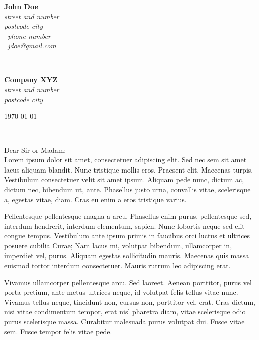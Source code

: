 \documentclass[11pt]{article}
\begin{document}
\hfill%
\begin{minipage}[t]{.6\textwidth}
\raggedleft%
{\bfseries John Doe}\\[.35ex]
\small\itshape%
street and number\\
postcode city\\[.35ex]
\Telefon~phone number\\
\Letter~\href{mailto:jdoe@gmail.com}{jdoe@gmail.com}
\end{minipage}\\[1em]
%
\begin{minipage}[t]{.4\textwidth}
\raggedright%
{\bfseries Company XYZ}\\[.35ex]
\small\itshape%
street and number\\
postcode city
\end{minipage}
\hfill %
\begin{minipage}[t]{.4\textwidth}
\raggedleft %
\today
\end{minipage}\\[2em]
\raggedright
Dear Sir or Madam:\\[1.5em]
%
Lorem ipsum dolor sit amet, consectetuer adipiscing elit. Sed nec sem sit amet lacus aliquam blandit. Nunc tristique mollis eros. Praesent elit. Maecenas turpis. Vestibulum consectetuer velit sit amet ipsum. Aliquam pede nunc, dictum ac, dictum nec, bibendum ut, ante. Phasellus justo urna, convallis vitae, scelerisque a, egestas vitae, diam. Cras eu enim a eros tristique varius.

Pellentesque pellentesque magna a arcu. Phasellus enim purus, pellentesque sed, interdum hendrerit, interdum elementum, sapien. Nunc lobortis neque sed elit congue tempus. Vestibulum ante ipsum primis in faucibus orci luctus et ultrices posuere cubilia Curae; Nam lacus mi, volutpat bibendum, ullamcorper in, imperdiet vel, purus. Aliquam egestas sollicitudin mauris. Maecenas quis massa euismod tortor interdum consectetuer. Mauris rutrum leo adipiscing erat.

Vivamus ullamcorper pellentesque arcu. Sed laoreet. Aenean porttitor, purus vel porta pretium, ante metus ultrices neque, id volutpat felis tellus vitae nunc. Vivamus tellus neque, tincidunt non, cursus non, porttitor vel, erat. Cras dictum, nisi vitae condimentum tempor, erat nisl pharetra diam, vitae scelerisque odio purus scelerisque massa. Curabitur malesuada purus volutpat dui. Fusce vitae sem. Fusce tempor felis vitae pede.
\end{document}
